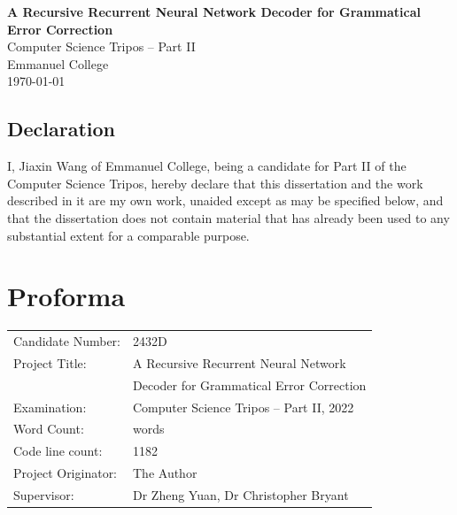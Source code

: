\documentclass[12pt,a4paper,twoside,openright]{report}
\newcommand{\quickwordcount}[1]{%
  \immediate\write18{texcount -1 -sum -merge -q #1.tex output.bbl > #1-words.sum }%
   words%
}
\begin{document}




\pagestyle{empty}


\vspace*{60mm}
\begin{center}
\Huge
\textbf{A Recursive Recurrent Neural Network Decoder for Grammatical Error Correction} \\[5mm]
Computer Science Tripos -- Part II \\[5mm]
Emmanuel College \\[5mm]
\today  %
\end{center}
\thispagestyle{empty}

\pagestyle{plain}
\newpage

\section*{Declaration}

I, Jiaxin Wang of Emmanuel College, being a candidate for Part II of the Computer
Science Tripos, hereby declare that this dissertation and the work described in 
it are my own work, unaided except as may be specified below, and that the dissertation
does not contain material that has already been used to any substantial
extent for a comparable purpose.

\bigskip
{}

\medskip
{}

\chapter*{Proforma}

{\large
\begin{tabular}{ll}
Candidate Number:   & 2432D \\
Project Title:      & A Recursive Recurrent Neural Network \\
 & Decoder for Grammatical Error Correction \\
Examination:        & Computer Science Tripos -- Part II, 2022  \\
Word Count:         & \quickwordcount{diss}\footnotemark[1] \\
Code line count:    & 1182 \footnotemark[2]\\
Project Originator: & The Author \\
Supervisor:         & Dr Zheng Yuan, Dr Christopher Bryant
\end{tabular}
}
\end{document}
